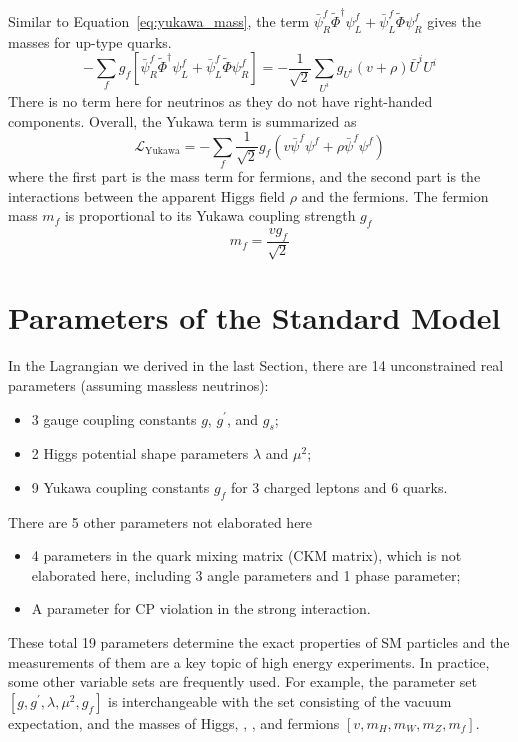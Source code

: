 Similar to Equation~\ref{eq:yukawa_mass}, the term $\bar{\psi}^{f}_{R}\tilde{\Phi}^{\dagger}\psi^{f}_{L} + \bar{\psi}^{f}_{L}\tilde{\Phi}\psi^{f}_{R}$ gives the masses for up-type quarks.
\begin{equation}
    - \sum_{f} g_{f} [\bar{\psi}^{f}_{R}\tilde{\Phi}^{\dagger}\psi^{f}_{L} + \bar{\psi}^{f}_{L}\tilde{\Phi}\psi^{f}_{R}]
    = - \frac{1}{\sqrt{2}} \sum_{U^{i}} g_{U^{i}}  (v+\rho) \bar{U}^{i} U^{i}
\end{equation}
There is no term here for neutrinos as they do not have right-handed components.
Overall, the Yukawa term is summarized as
\begin{equation}\label{eq:Lagrangian_yukawa}
    \mathcal{L}_{\text{Yukawa}} = - \sum_{f} \frac{1}{\sqrt{2}} g_{f} (v\bar{\psi}^{f}\psi^{f} + \rho \bar{\psi}^{f}\psi^{f})
\end{equation}
where the first part is the mass term for fermions, 
and the second part is the interactions between the apparent Higgs field $\rho$ and the fermions.
The fermion mass $m_{f}$ is proportional to its Yukawa coupling strength $g_{f}$
\begin{equation}\label{eq:fermion_mass}
    m_{f} = \frac{vg_{f}}{\sqrt{2}}
\end{equation} 


\section{Parameters of the Standard Model}\label{sec:SM_parameters}

In the Lagrangian we derived in the last Section, there are 14 unconstrained real parameters (assuming massless neutrinos):
\begin{itemize}
  \item 3 gauge coupling constants $g$, $g^{\prime}$, and $g_{s}$;
  \item 2 Higgs potential shape parameters $\lambda$ and $\mu^{2}$;
  \item 9 Yukawa coupling constants $g_{f}$ for 3 charged leptons and 6 quarks.
\end{itemize}
There are 5 other parameters not elaborated here
\begin{itemize}
  \item 4 parameters in the quark mixing matrix (CKM matrix), which is not elaborated here, including 3 angle parameters and 1 phase parameter;
  \item A parameter for CP violation in the strong interaction.
\end{itemize}
These total 19 parameters determine the exact properties of SM particles and the measurements of them are a key topic of high energy experiments. 
In practice, some other variable sets are frequently used. 
For example, the parameter set $[g, g^{\prime}, \lambda, \mu^{2}, g_{f}]$ is interchangeable with 
the set consisting of the vacuum expectation, and the masses of Higgs, \PW, \PZ, and fermions $[v, m_{H}, m_{W}, m_{Z}, m_{f}]$.


